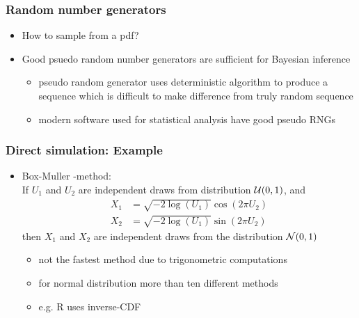 \documentclass[10pt]{beamer}
\begin{document}
\begin{frame}

\frametitle{Random number generators}

  \begin{itemize}
  \item {\color{uured}How to sample from a pdf?}
  \pause
  \item Good {\color{uured} psuedo} random number generators are sufficient for Bayesian inference
  \begin{itemize}
    \item pseudo random generator uses deterministic algorithm to
      produce a sequence which is difficult to make difference from
      truly random sequence
    \item modern software used for statistical analysis have good
      pseudo RNGs
    \end{itemize}
  \end{itemize}

\end{frame}

\begin{frame}


\frametitle{Direct simulation: Example}

  \begin{itemize}
  \item Box-Muller -method:\\ If $U_1$ and $U_2$ are independent
    draws from distribution $\mathcal{U}(0,1)$, and
    \begin{align*}
      X_1 & = \sqrt{-2\log(U_1)}\cos(2\pi U_2) \\
      X_2 & = \sqrt{-2\log(U_1)}\sin(2\pi U_2)
    \end{align*}
    then $X_1$ and $X_2$ are independent draws from the distribution
    $\mathcal{N}(0,1)$
    \pause
    \begin{itemize}
      \item not the fastest method due to trigonometric computations
      \item for normal distribution more than ten different methods
      \item e.g. R uses inverse-CDF
    \end{itemize}
  \end{itemize}

\end{frame}
\end{document}
